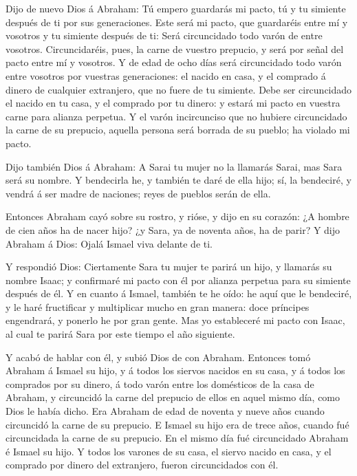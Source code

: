 Dijo de nuevo Dios á Abraham: Tú empero guardarás mi pacto,
tú y tu simiente después de ti por sus generaciones.  Este
será mi pacto, que guardaréis entre mí y vosotros y tu simiente después
de ti: Será circuncidado todo varón de entre vosotros. 
Circuncidaréis, pues, la carne de vuestro prepucio, y será por señal del
pacto entre mí y vosotros.  Y de edad de ocho días será
circuncidado todo varón entre vosotros por vuestras generaciones: el
nacido en casa, y el comprado á dinero de cualquier extranjero, que no
fuere de tu simiente.  Debe ser circuncidado el nacido en
tu casa, y el comprado por tu dinero: y estará mi pacto en vuestra carne
para alianza perpetua.  Y el varón incircunciso que no
hubiere circuncidado la carne de su prepucio, aquella persona será
borrada de su pueblo; ha violado mi pacto.

 Dijo también Dios á Abraham: A Sarai tu mujer no la
llamarás Sarai, mas Sara será su nombre.  Y bendecirla he,
y también te daré de ella hijo; sí, la bendeciré, y vendrá á ser madre
de naciones; reyes de pueblos serán de ella.

 Entonces Abraham cayó sobre su rostro, y rióse, y dijo en
su corazón: ¿A hombre de cien años ha de nacer hijo? ¿y Sara, ya de
noventa años, ha de parir?  Y dijo Abraham á Dios: Ojalá
Ismael viva delante de ti.

 Y respondió Dios: Ciertamente Sara tu mujer te parirá un
hijo, y llamarás su nombre Isaac; y confirmaré mi pacto con él por
alianza perpetua para su simiente después de él.  Y en
cuanto á Ismael, también te he oído: he aquí que le bendeciré, y le haré
fructificar y multiplicar mucho en gran manera: doce príncipes
engendrará, y ponerlo he por gran gente.  Mas yo
estableceré mi pacto con Isaac, al cual te parirá Sara por este tiempo
el año siguiente.

 Y acabó de hablar con él, y subió Dios de con Abraham.
 Entonces tomó Abraham á Ismael su hijo, y á todos los
siervos nacidos en su casa, y á todos los comprados por su dinero, á
todo varón entre los domésticos de la casa de Abraham, y circuncidó la
carne del prepucio de ellos en aquel mismo día, como Dios le había
dicho.  Era Abraham de edad de noventa y nueve años cuando
circuncidó la carne de su prepucio.  E Ismael su hijo era
de trece años, cuando fué circuncidada la carne de su prepucio.
 En el mismo día fué circuncidado Abraham é Ismael su hijo.
 Y todos los varones de su casa, el siervo nacido en casa,
y el comprado por dinero del extranjero, fueron circuncidados con él.

